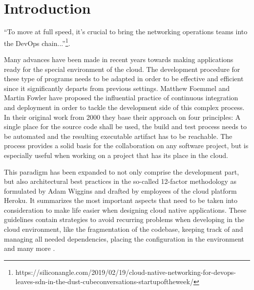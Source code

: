 	\section{Introduction}
%

``To move at full speed, it’s crucial to bring the networking operations teams into the DevOps chain...''\footnote{https://siliconangle.com/2019/02/19/cloud-native-networking-for-devops-leaves-sdn-in-the-dust-cubeconversations-startupoftheweek/}.

Many advances have been made in recent years towards making applications ready for the special environment of the cloud. The development procedure for these type of programs needs to be adapted in order to be effective and efficient since it significantly departs from previous settings. Matthew Foemmel and Martin Fowler have proposed the influential practice of continuous integration and deployment \cite{fowler_2006} \cite{fowler_foemmel_2000} in order to tackle the development side of this complex process. In their original work from 2000 they base their approach on four principles: A single place for the source code shall be used, the build and test process needs to be automated and the resulting executable artifact has to be reachable.
The process provides a solid basis for the collaboration on any software project, but is especially useful when working on a project that has its place in the cloud. 

This paradigm has been expanded to not only comprise the development part, but also architectural best practices in the so-called 12-factor methodology as formulated by Adam Wiggins and drafted by employees of the cloud platform Heroku. It summarizes the most important aspects that need to be taken into consideration to make life easier when designing cloud native applications. These guidelines contain strategies to avoid recurring problems when developing in the cloud environment, like the fragmentation of the codebase, keeping track of and managing all needed dependencies, placing the configuration in the environment and many more \cite{hofmann2017microservices} \cite{12Factor}. 


